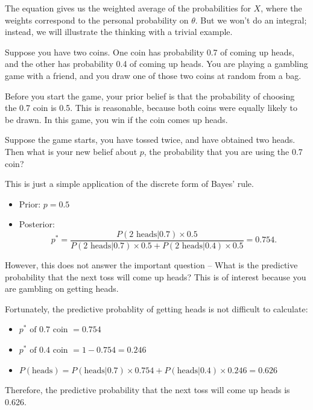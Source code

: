 \documentclass[]{book}
\providecommand{\tightlist}{%
  \setlength{\itemsep}{0pt}\setlength{\parskip}{0pt}}
\theoremstyle{definition}
\theoremstyle{definition}
\theoremstyle{definition}
\theoremstyle{remark}
\let\BeginKnitrBlock\begin \let\EndKnitrBlock\end
\begin{document}
The equation gives us the weighted average of the probabilities for
\(X\), where the weights correspond to the personal probability on
\(\theta\). But we won't do an integral; instead, we will illustrate the
thinking with a trivial example.

\BeginKnitrBlock{example}
\protect\hypertarget{exm:unnamed-chunk-1}{}{\label{exm:unnamed-chunk-1}
}Suppose you have two coins. One coin has probability 0.7 of coming up
heads, and the other has probability 0.4 of coming up heads. You are
playing a gambling game with a friend, and you draw one of those two
coins at random from a bag.

Before you start the game, your prior belief is that the probability of
choosing the 0.7 coin is 0.5. This is reasonable, because both coins
were equally likely to be drawn. In this game, you win if the coin comes
up heads.

Suppose the game starts, you have tossed twice, and have obtained two
heads. Then what is your new belief about \(p\), the probability that
you are using the 0.7 coin?
\EndKnitrBlock{example}

This is just a simple application of the discrete form of Bayes' rule.

\begin{itemize}
\tightlist
\item
  Prior: \(p=0.5\)
\item
  Posterior:
  \[p^* = \frac{P(\text{2 heads}|0.7) \times 0.5}{P(\text{2 heads}|0.7) \times 0.5 + P(\text{2 heads}|0.4) \times 0.5} = 0.754.\]
\end{itemize}

However, this does not answer the important question -- What is the
predictive probability that the next toss will come up heads? This is of
interest because you are gambling on getting heads.

Fortunately, the predictive probablity of getting heads is not difficult
to calculate:

\begin{itemize}
\tightlist
\item
  \(p^* \text{ of 0.7 coin } = 0.754\)
\item
  \(p^* \text{ of 0.4 coin } = 1 − 0.754 = 0.246\)
\item
  \(P(\text{heads}) = P(\text{heads} | 0.7) \times 0.754 + P(\text{heads} | 0.4) \times 0.246 = 0.626\)
\end{itemize}

Therefore, the predictive probability that the next toss will come up
heads is 0.626.
\end{document}

